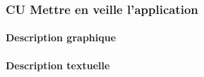 \subsubsection{CU Mettre en veille l'application}
\paragraph{Description graphique}
\medskip
\paragraph{Description textuelle}
\medskip